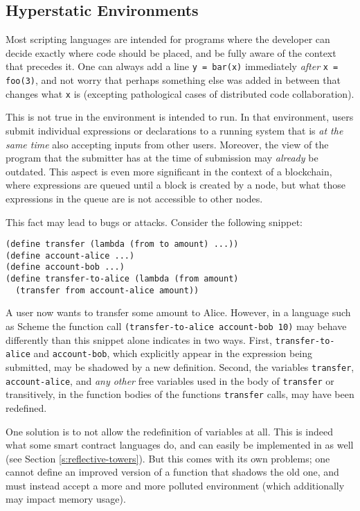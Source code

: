 \subsection{Hyperstatic Environments}
\label{s:hyperstatic}

Most scripting languages are intended for programs where the developer can
decide exactly where code should be placed, and be fully aware of the context
that precedes it. One can always add a line \texttt{y = bar(x)} immediately
\emph{after} \texttt{x = foo(3)}, and not worry that perhaps something else was
added in between that changes what \texttt{x} is (excepting pathological cases
of distributed code collaboration).

This is not true in the environment \rad{} is intended to run. In that
environment, users submit individual expressions or declarations to a running
system that is \emph{at the same time} also accepting inputs from other
users. Moreover, the view of the program that the submitter has at the time of
submission may \emph{already} be outdated. This aspect is even more significant
in the context of a blockchain, where expressions are queued until a block is
created by a node, but what those expressions in the queue are is not
accessible to other nodes.

This fact may lead to bugs or attacks. Consider the following snippet:
\begin{lstlisting}
(define transfer (lambda (from to amount) ...))
(define account-alice ...)
(define account-bob ...)
(define transfer-to-alice (lambda (from amount)
  (transfer from account-alice amount))
\end{lstlisting}
A user now wants to transfer some amount to Alice. However, in a language such
as Scheme the function call \texttt{(transfer-to-alice account-bob 10)} may
behave differently than this snippet alone indicates in two ways. First,
\texttt{transfer-to-alice} and \texttt{account-bob}, which explicitly appear in
the expression being submitted, may be shadowed by a new definition. Second, the
variables \texttt{transfer}, \texttt{account-alice}, and \emph{any other} free
variables used in the body of \texttt{transfer} or transitively, in the function
bodies of the functions \texttt{transfer} calls, may have been redefined.

One solution is to not allow the redefinition of variables at all. This is
indeed what some smart contract languages do, and can easily be implemented in
\rad{} as well (see Section \ref{s:reflective-towers}). But this comes with its
own problems; one cannot define an improved version of a function that shadows
the old one, and must instead accept a more and more polluted environment (which
additionally may impact memory usage).

